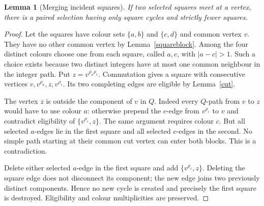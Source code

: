 \documentclass[11pt,a4paper]{article}
\newtheorem{lemma}[theorem]{Lemma}
\begin{document}
\begin{lemma}[Merging incident squares]\label{incident}
If two selected squares meet at a vertex, there is a paired selection
having only square cycles and strictly fewer squares.
\end{lemma}
\begin{proof}
Let the squares have colour sets $\{a,b\}$ and $\{c,d\}$ and common
vertex $v$. They have no other common vertex by
Lemma~\ref{squareblock}. Among the four distinct colours choose one
from each square, called $a,c$, with $|a-c|>1$. Such a choice exists
because two distinct integers have at most one common neighbour in
the integer path. Put $z=v^{\rho_a\rho_c}$.
Commutation gives a square with consecutive vertices
$v,v^{\rho_a},z,v^{\rho_c}$. Its two completing edges are eligible
by Lemma~\ref{cut}.

The vertex $z$ is outside the component of $v$ in $Q$. Indeed every
$Q$-path from $v$ to $z$ would have to use colour $a$: otherwise
prepend the $c$-edge from $v^{\rho_c}$ to $v$ and contradict
eligibility of $\{v^{\rho_c},z\}$. The same argument requires
colour $c$. But all selected $a$-edges lie in the first square and
all selected $c$-edges in the second. No simple path starting at
their common cut vertex can enter both blocks. This is a contradiction.

Delete either selected $a$-edge in the first square and add
$\{v^{\rho_c},z\}$. Deleting the square edge does not disconnect
its component; the new edge joins two previously distinct
components. Hence no new cycle is created and precisely the first
square is destroyed. Eligibility and colour multiplicities are preserved.
\end{proof}
\end{document}
